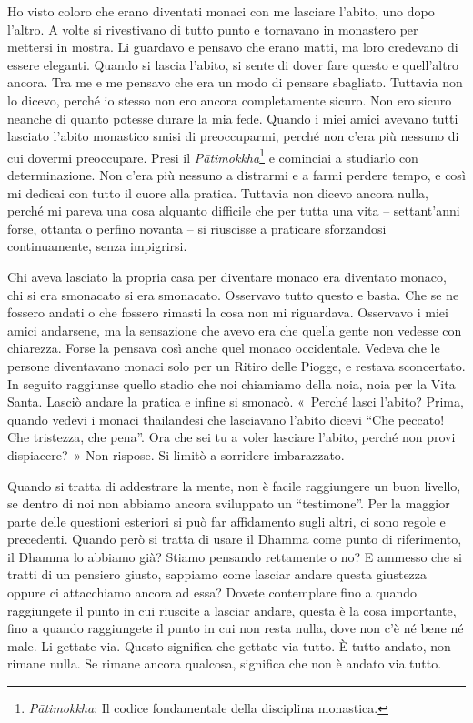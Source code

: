 Ho visto coloro che erano diventati monaci con me lasciare l'abito, uno
dopo l'altro. A volte si rivestivano di tutto punto e tornavano in
monastero per mettersi in mostra. Li guardavo e pensavo che erano matti,
ma loro credevano di essere eleganti. Quando si lascia l'abito, si sente
di dover fare questo e quell'altro ancora. Tra me e me pensavo che era
un modo di pensare sbagliato. Tuttavia non lo dicevo, perché io stesso
non ero ancora completamente sicuro. Non ero sicuro neanche di quanto
potesse durare la mia fede. Quando i miei amici avevano tutti lasciato
l'abito monastico smisi di preoccuparmi, perché non c'era più nessuno di
cui dovermi preoccupare. Presi il \emph{Pātimokkha}\footnote{\emph{Pātimokkha}:
  Il codice fondamentale della disciplina monastica.} e cominciai a
studiarlo con determinazione. Non c'era più nessuno a distrarmi e a
farmi perdere tempo, e così mi dedicai con tutto il cuore alla pratica.
Tuttavia non dicevo ancora nulla, perché mi pareva una cosa alquanto
difficile che per tutta una vita -- settant'anni forse, ottanta o
perfino novanta -- si riuscisse a praticare sforzandosi continuamente,
senza impigrirsi.

Chi aveva lasciato la propria casa per diventare monaco era diventato
monaco, chi si era smonacato si era smonacato. Osservavo tutto questo e
basta. Che se ne fossero andati o che fossero rimasti la cosa non mi
riguardava. Osservavo i miei amici andarsene, ma la sensazione che avevo
era che quella gente non vedesse con chiarezza. Forse la pensava così
anche quel monaco occidentale. Vedeva che le persone diventavano monaci
solo per un Ritiro delle Piogge, e restava sconcertato. In seguito
raggiunse quello stadio che noi chiamiamo della noia, noia per la Vita
Santa. Lasciò andare la pratica e infine si smonacò. «~Perché lasci
l'abito? Prima, quando vedevi i monaci thailandesi che lasciavano
l'abito dicevi ``Che peccato! Che tristezza, che pena''. Ora che sei tu
a voler lasciare l'abito, perché non provi dispiacere?~» Non rispose. Si
limitò a sorridere imbarazzato.

Quando si tratta di addestrare la mente, non è facile raggiungere un
buon livello, se dentro di noi non abbiamo ancora sviluppato un
``testimone''. Per la maggior parte delle questioni esteriori si può far
affidamento sugli altri, ci sono regole e precedenti. Quando però si
tratta di usare il Dhamma come punto di riferimento, il Dhamma lo
abbiamo già? Stiamo pensando rettamente o no? E ammesso che si tratti di
un pensiero giusto, sappiamo come lasciar andare questa giustezza oppure
ci attacchiamo ancora ad essa? Dovete contemplare fino a quando
raggiungete il punto in cui riuscite a lasciar andare, questa è la cosa
importante, fino a quando raggiungete il punto in cui non resta nulla,
dove non c'è né bene né male. Li gettate via. Questo significa che
gettate via tutto. È tutto andato, non rimane nulla. Se rimane ancora
qualcosa, significa che non è andato via tutto.

